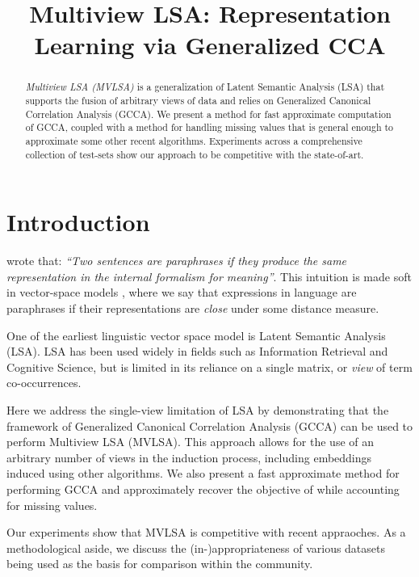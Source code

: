 \documentclass[11pt]{article}
\title{Multiview LSA: Representation Learning via Generalized CCA}
\date{}
\newcommand{\raman}[1]{ (\textcolor{red}{Raman: #1})}
\begin{document}
\maketitle
\begin{abstract}
  \emph{Multiview LSA (MVLSA)} is a generalization of Latent Semantic Analysis (LSA) that supports the 
  fusion of arbitrary views of data and relies on Generalized Canonical Correlation
  Analysis (GCCA). We present a method
  for fast approximate computation of GCCA, coupled with a method
  for handling missing values that is general enough to approximate
  some other recent algorithms. Experiments across a comprehensive
  collection of test-sets show our approach to be competitive with the
  state-of-art.   
\end{abstract}

\section{Introduction}
 wrote that: \emph{``Two sentences
  are paraphrases if they produce the same representation in the
  internal formalism for meaning''}.  This intuition is made soft in
vector-space models \cite{turney2010frequency}, where we say that
expressions in language are paraphrases if
their representations are \emph{close} under some distance measure.

One of the earliest linguistic vector space model is Latent
Semantic Analysis (LSA).  LSA has been used widely in fields such
as Information Retrieval and Cognitive Science, but is limited in its
reliance on a single matrix, or \emph{view} of term co-occurrences.



Here we address the single-view limitation of LSA by demonstrating
that the framework of Generalized Canonical Correlation Analysis
(GCCA) can be used to perform Multiview LSA (MVLSA). This
approach allows for the use of an arbitrary number of views in the
induction process, including embeddings
induced using other algorithms. We also present a fast approximate method
for performing GCCA and approximately recover the objective of
\cite{pennington2014glove} while accounting for missing values.

Our experiments show that MVLSA is competitive with recent appraoches.
As a methodological aside, we discuss the (in-)appropriateness of
various datasets being used as the basis for comparison within the community.
\end{document}

